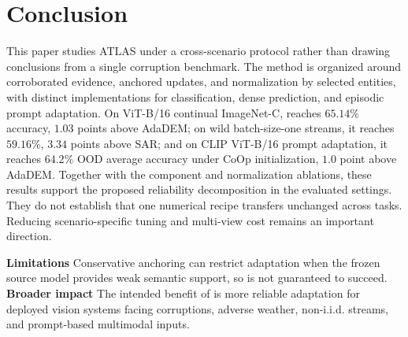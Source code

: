 \section{Conclusion}

This paper studies ATLAS under a cross-scenario protocol rather than drawing conclusions from a single corruption benchmark. The method is organized around corroborated evidence, anchored updates, and normalization by selected entities, with distinct implementations for classification, dense prediction, and episodic prompt adaptation. On ViT-B/16 continual ImageNet-C, \method{} reaches $65.14\%$ accuracy, $1.03$ points above AdaDEM; on wild batch-size-one streams, it reaches $59.16\%$, $3.34$ points above SAR; and on CLIP ViT-B/16 prompt adaptation, it reaches $64.2\%$ OOD average accuracy under CoOp initialization, $1.0$ point above AdaDEM. Together with the component and normalization ablations, these results support the proposed reliability decomposition in the evaluated settings. They do not establish that one numerical recipe transfers unchanged across tasks. Reducing scenario-specific tuning and multi-view cost remains an important direction.


\textbf{Limitations}
Conservative anchoring can restrict adaptation when the frozen source model provides weak semantic support, so \method{} is not guaranteed to succeed.
\textbf{Broader impact}
The intended benefit of \method{} is more reliable adaptation for deployed vision systems facing corruptions, adverse weather, non-i.i.d. streams, and prompt-based multimodal inputs.
